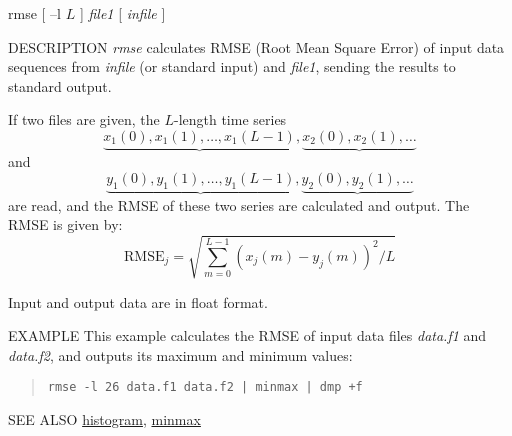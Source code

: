 \begin{synopsis}
\item [rmse] [ --l $L$ ] {\em file1} [ {\em infile} ]
\end{synopsis}

\begin{qsection}{DESCRIPTION}
{\em rmse} calculates RMSE (Root Mean Square Error) of input data sequences 
from {\em infile} (or standard input) and {\em file1}, 
sending the results to standard output.

If two files are given, the $L$-length time series 
\begin{displaymath}
  \underbrace{x_1(0),x_1(1),\dots,x_1(L-1)},\underbrace{x_2(0),x_2(1),\dots}
\end{displaymath}
and
\begin{displaymath}
  \underbrace{y_1(0),y_1(1),\dots,y_1(L-1)},\underbrace{y_2(0),y_2(1),\dots}
\end{displaymath}
are read,
and the RMSE of these two series are calculated and output.
 The RMSE is given by:
\begin{displaymath}
\mathrm{RMSE}_j = \sqrt{\sum_{m=0}^{L-1} (x_j(m)-y_j(m))^2/L}
\end{displaymath}

Input and output data are in float format.
\end{qsection}

\begin{options}
\end{options}

\begin{qsection}{EXAMPLE}
This example calculates the RMSE of input data files {\em data.f1} and {\em
data.f2}, and outputs its maximum and minimum values:
\begin{quote}
 \verb!rmse -l 26 data.f1 data.f2 | minmax | dmp +f!
\end{quote}
\end{qsection}

\begin{qsection}{SEE ALSO}
\hyperlink{histogram}{histogram},
\hyperlink{minmax}{minmax}
\end{qsection}
